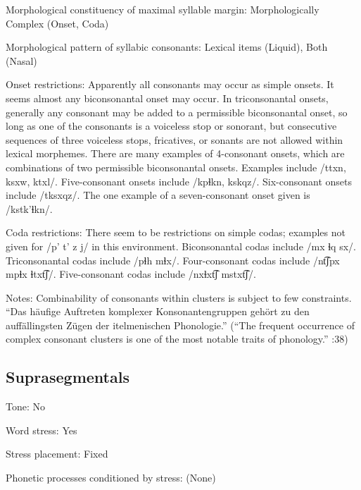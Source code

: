{\begin{appendixdesc}
\item[Morphological constituency of maximal syllable margin:] Morphologically Complex (Onset, Coda)

\item[Morphological pattern of syllabic consonants:] Lexical items (Liquid), Both (Nasal)

\item[Onset restrictions:] Apparently all consonants may occur as simple onsets. It seems almost any biconsonantal onset may occur. In triconsonantal onsets, generally any consonant may be added to a permissible biconsonantal onset, so long as one of the consonants is a voiceless stop or sonorant, but consecutive sequences of three voiceless stops, fricatives, or sonants are not allowed within lexical morphemes. There are many examples of 4-consonant onsets, which are combinations of two permissible biconsonantal onsets. Examples include /ttxn, ksxw, ktxl/. Five-consonant onsets include /kpɬkn, kskqz/. Six-consonant onsets include /tksxqz/. The one example of a seven-consonant onset given is /kstk’ɬkn/.

\item[Coda restrictions:] There seem to be restrictions on simple codas; examples not given for /p’ t’ z j/ in this environment. Biconsonantal codas include /mx ɬq sx/. Triconsonantal codas include /pɬh mɬx/. Four-consonant codas include /nt͡ʃpx mpɬx ɬtxt͡ʃ/. Five-consonant codas include /nxɬxt͡ʃ mstxt͡ʃ/.

\item[Notes:] Combinability of consonants within clusters is subject to few constraints. “Das häufige Auftreten komplexer Konsonantengruppen gehört zu den auffällingsten Zügen der itelmenischen Phonologie.” (“The frequent occurrence of complex consonant clusters is one of the most notable traits of  phonology.” \citealt{GeorgVolodin1999}:38)
\end{appendixdesc}
\subsection*{Suprasegmentals}
\begin{appendixdesc}
\item[Tone:] No

\item[Word stress:] Yes

\item[Stress placement:] Fixed

\item[Phonetic processes conditioned by stress:] (None)


\end{appendixdesc}}
